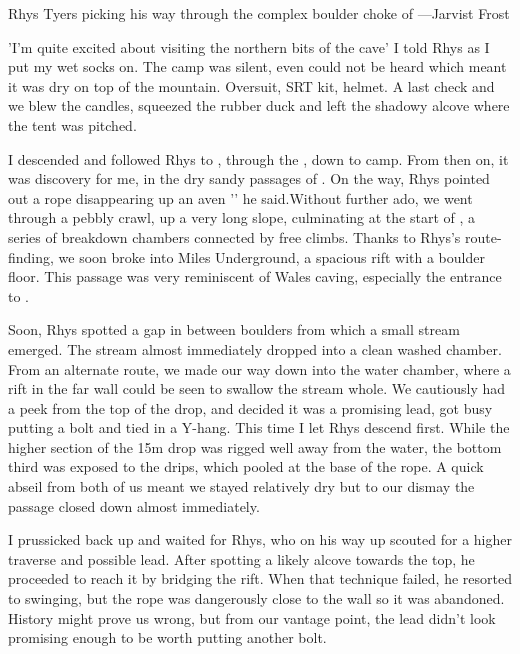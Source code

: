  \begin{marginfigure}
\checkoddpage \ifoddpage \forcerectofloat \else \forceversofloat \fi
\centering
 \caption{Rhys Tyers picking his way through the complex boulder choke of \protect{} ---Jarvist Frost}
 \label{smash}
\end{marginfigure}

'I'm quite excited about visiting the northern bits of the cave' I told Rhys as I put my wet socks on. The camp was silent, even  could not be heard which meant it was dry on top of the mountain. Oversuit, SRT kit, helmet. A last check and we blew the candles, squeezed the rubber duck and left the shadowy alcove where the tent was pitched.

I descended  and followed Rhys to , through the , down  to  camp. From then on, it was discovery for me, in the dry sandy passages of . On the way, Rhys pointed out a rope disappearing up an aven '' he said.Without further ado, we went through a pebbly crawl, up a very long slope, culminating at the start of , a series of breakdown chambers connected by free climbs. Thanks to Rhys's route-finding, we soon broke into Miles Underground, a spacious rift with a boulder floor. This passage was very reminiscent of Wales caving, especially the entrance to .

Soon, Rhys spotted a gap in between boulders from which a small stream emerged. The stream almost immediately dropped into a clean washed chamber. From an alternate route, we made our way down into the water chamber, where a rift in the far wall could be seen to swallow the stream whole. We cautiously had a peek from the top of the drop, and decided it was a promising lead, got busy putting a bolt and tied in a Y-hang. This time I let Rhys descend first. While the higher section of the 15m drop was rigged well away from the water, the bottom third was exposed to the drips, which pooled at the base of the rope. A quick abseil from both of us meant we stayed relatively dry but to our dismay the passage closed down almost immediately. 

I prussicked back up and waited for Rhys, who on his way up scouted for a higher traverse and possible lead. After spotting a likely alcove towards the top, he proceeded to reach it by bridging the rift. When that technique failed, he resorted to swinging, but the rope was dangerously close to the wall so it was abandoned. History might prove us wrong, but from our vantage point, the lead didn't look promising enough to be worth putting another bolt. 


